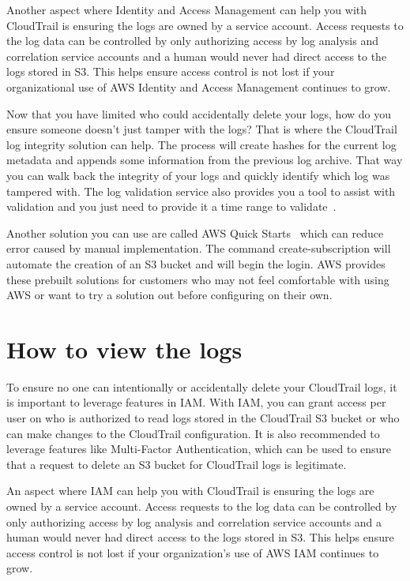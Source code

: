Another aspect where Identity and Access Management can help you with CloudTrail 
is ensuring the logs are owned by a service account. Access requests to the log 
data can be controlled by only authorizing access by log analysis and correlation 
service accounts and a human would never had direct access to the logs stored in 
S3. This helps ensure access control is not lost if your organizational use of 
AWS Identity and Access Management continues to grow. 

Now that you have limited who could accidentally delete your logs, how do you 
ensure someone doesn’t just tamper with the logs? That is where the CloudTrail 
log integrity solution can help. The process will create hashes for the current 
log metadata and appends some information from the previous log archive. That 
way you can walk back the integrity of your logs and quickly identify which log
 was tampered with. The log validation service also provides you a tool to 
assist with validation and you just need to provide it a time range to 
validate~\cite{hid-sp18-518-CloudTrail-user-guide}.

Another solution you can use are called AWS Quick 
Starts~\cite{hid-sp18-518-CloudTrail-Quick-Starts} which can reduce error 
caused by manual implementation. The command create-subscription will automate the 
creation of an S3 bucket and will begin the login. AWS provides these prebuilt
solutions for customers who may not feel comfortable with using AWS or want
to try a solution out before configuring on their own.

\section{How to view the logs}

To ensure no one can intentionally or accidentally delete your CloudTrail logs,
 it is important to leverage features in IAM. With IAM, you can grant access 
per user on who is authorized to read logs stored in the CloudTrail S3 bucket 
or who can make changes to the CloudTrail configuration. It is also recommended 
to leverage features like Multi-Factor Authentication, which can be used to 
ensure that a request to delete an S3 bucket for CloudTrail logs is legitimate.
 
An aspect where IAM can help you with CloudTrail is ensuring the logs are owned 
by a service account. Access requests to the log data can be controlled by only 
authorizing access by log analysis and correlation service accounts and a human
 would never had direct access to the logs stored in S3. This helps ensure 
access control is not lost if your organization’s use of AWS IAM continues to 
grow. 

